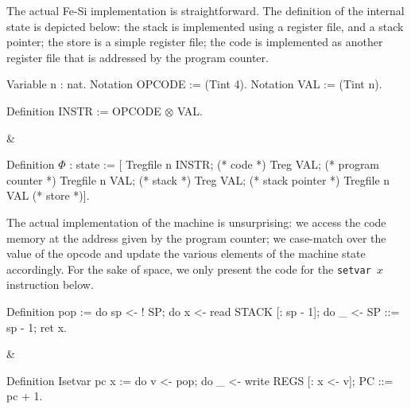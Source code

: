 \documentclass{llncs}
\begin{document}
The actual Fe-Si implementation is straightforward. The definition of
the internal state is depicted below: the stack is implemented using a
register file, and a stack pointer; the store is a simple register
file; the code is implemented as another register file that is
addressed by the program counter.

\begin{twolistings}
\begin{coq}
Variable n : nat. 
Notation OPCODE := (Tint 4).  
Notation VAL := (Tint n). 

Definition INSTR := OPCODE $\otimes$ VAL.  
$ $
\end{coq}
&
\begin{coq}
Definition $\Phi$ : state := [
Tregfile n INSTR;       (* code *)
Treg VAL;               (* program counter *)
Tregfile n VAL;         (* stack *)
Treg VAL;               (* stack pointer *)
Tregfile n VAL          (* store *)]. 
\end{coq}
\end{twolistings}

The actual implementation of the machine is unsurprising: we access
the code memory at the address given by the program counter; we
case-match over the value of the opcode and update the various
elements of the machine state accordingly. 
%
For the sake of space, we only present the code for the \texttt{setvar
  $x$} instruction below.

\begin{twolistings}
\begin{coq}
Definition pop :=
do sp <- ! SP;       
do x <- read STACK [: sp - 1];
do _ <- SP ::= sp - 1;
ret x.    
\end{coq}
&
\begin{coq}
Definition Isetvar pc x := 
do v <- pop; 
do _ <- write REGS [: x <- v];
PC ::= pc + 1.
$ $
\end{coq}
\end{twolistings}
\end{document}
